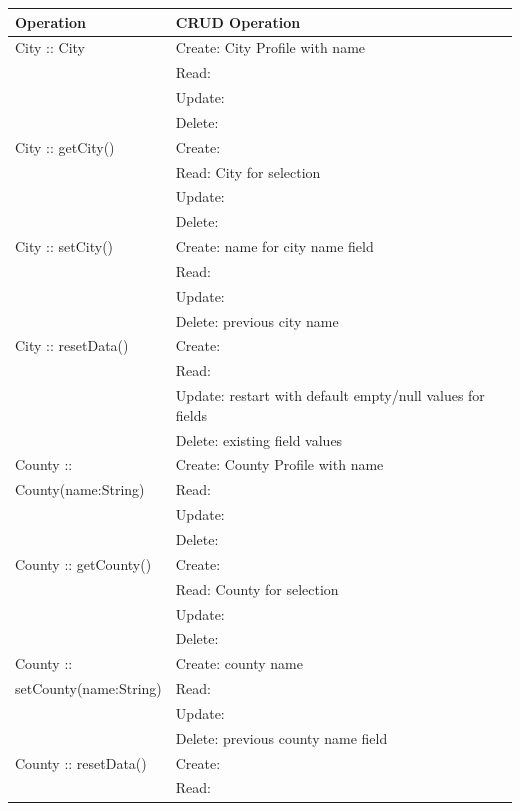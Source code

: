 \renewcommand{\arraystretch}{1}
\begin{longtable}{|p{.3\linewidth}|p{.7\linewidth}|}
    \hline
    Operation & CRUD Operation \\ \hline
    City :: City & Create: City Profile with name \\
                & Read: \\
               & Update: \\
               & Delete: \\ \hline
    City :: getCity() & Create: \\
                     & Read: City for selection \\
                     & Update: \\
                     & Delete: \\ \hline
    City :: setCity() & Create: name for city name field\\
                     & Read:  \\
                     & Update: \\
                     & Delete: previous city name\\ \hline
    City :: resetData() & Create: \\
                     & Read:  \\
                     & Update: restart with default empty/null values for fields\\
                     & Delete: existing field values \\ \hline
    County ::  & Create: County Profile with name \\
    County(name:String) & Read: \\
               & Update: \\
               & Delete: \\ \hline
    County :: getCounty() & Create:  \\
                & Read: County for selection\\
               & Update: \\
               & Delete: \\ \hline
    County :: & Create: county name  \\
    setCounty(name:String) & Read: \\
               & Update: \\
               & Delete: previous county name field\\ \hline
    County :: resetData() & Create:  \\
                & Read: \\

\end{longtable}
